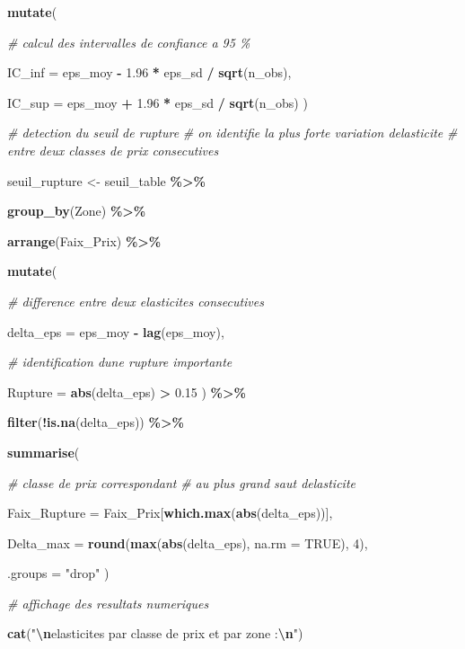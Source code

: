 \documentclass[
]{article}
\newenvironment{Shaded}{\begin{snugshade}}{\end{snugshade}}
\newcommand{\AttributeTok}[1]{\textcolor[rgb]{0.13,0.29,0.53}{#1}}
\newcommand{\CommentTok}[1]{\textcolor[rgb]{0.56,0.35,0.01}{\textit{#1}}}
\newcommand{\ConstantTok}[1]{\textcolor[rgb]{0.56,0.35,0.01}{#1}}
\newcommand{\DecValTok}[1]{\textcolor[rgb]{0.00,0.00,0.81}{#1}}
\newcommand{\FloatTok}[1]{\textcolor[rgb]{0.00,0.00,0.81}{#1}}
\newcommand{\FunctionTok}[1]{\textcolor[rgb]{0.13,0.29,0.53}{\textbf{#1}}}
\newcommand{\NormalTok}[1]{#1}
\newcommand{\OtherTok}[1]{\textcolor[rgb]{0.56,0.35,0.01}{#1}}
\newcommand{\SpecialCharTok}[1]{\textcolor[rgb]{0.81,0.36,0.00}{\textbf{#1}}}
\newcommand{\StringTok}[1]{\textcolor[rgb]{0.31,0.60,0.02}{#1}}
\begin{document}
\begin{Shaded}
\begin{Highlighting}[]
  \FunctionTok{mutate}\NormalTok{(}

    \CommentTok{\# calcul des intervalles de confiance a 95 \%}

    \AttributeTok{IC\_inf =}\NormalTok{ eps\_moy }\SpecialCharTok{{-}} \FloatTok{1.96} \SpecialCharTok{*}\NormalTok{ eps\_sd }\SpecialCharTok{/} \FunctionTok{sqrt}\NormalTok{(n\_obs),}

    \AttributeTok{IC\_sup =}\NormalTok{ eps\_moy }\SpecialCharTok{+} \FloatTok{1.96} \SpecialCharTok{*}\NormalTok{ eps\_sd }\SpecialCharTok{/} \FunctionTok{sqrt}\NormalTok{(n\_obs)}
\NormalTok{  )}


\CommentTok{\# detection du seuil de rupture}
\CommentTok{\# on identifie la plus forte variation d\textquotesingle{}elasticite}
\CommentTok{\# entre deux classes de prix consecutives}

\NormalTok{seuil\_rupture }\OtherTok{\textless{}{-}}\NormalTok{ seuil\_table }\SpecialCharTok{\%\textgreater{}\%}

  \FunctionTok{group\_by}\NormalTok{(Zone) }\SpecialCharTok{\%\textgreater{}\%}

  \FunctionTok{arrange}\NormalTok{(Faix\_Prix) }\SpecialCharTok{\%\textgreater{}\%}

  \FunctionTok{mutate}\NormalTok{(}

    \CommentTok{\# difference entre deux elasticites consecutives}

    \AttributeTok{delta\_eps =}\NormalTok{ eps\_moy }\SpecialCharTok{{-}} \FunctionTok{lag}\NormalTok{(eps\_moy),}

    \CommentTok{\# identification d\textquotesingle{}une rupture importante}

    \AttributeTok{Rupture =} \FunctionTok{abs}\NormalTok{(delta\_eps) }\SpecialCharTok{\textgreater{}} \FloatTok{0.15}
\NormalTok{  ) }\SpecialCharTok{\%\textgreater{}\%}

  \FunctionTok{filter}\NormalTok{(}\SpecialCharTok{!}\FunctionTok{is.na}\NormalTok{(delta\_eps)) }\SpecialCharTok{\%\textgreater{}\%}

  \FunctionTok{summarise}\NormalTok{(}

    \CommentTok{\# classe de prix correspondant}
    \CommentTok{\# au plus grand saut d\textquotesingle{}elasticite}

    \AttributeTok{Faix\_Rupture =}\NormalTok{ Faix\_Prix[}\FunctionTok{which.max}\NormalTok{(}\FunctionTok{abs}\NormalTok{(delta\_eps))],}

    \AttributeTok{Delta\_max =} \FunctionTok{round}\NormalTok{(}\FunctionTok{max}\NormalTok{(}\FunctionTok{abs}\NormalTok{(delta\_eps), }\AttributeTok{na.rm =} \ConstantTok{TRUE}\NormalTok{), }\DecValTok{4}\NormalTok{),}

    \AttributeTok{.groups =} \StringTok{"drop"}
\NormalTok{  )}


\CommentTok{\# affichage des resultats numeriques}

\FunctionTok{cat}\NormalTok{(}\StringTok{"}\SpecialCharTok{\textbackslash{}n}\StringTok{elasticites par classe de prix et par zone :}\SpecialCharTok{\textbackslash{}n}\StringTok{"}\NormalTok{)}
\end{Highlighting}
\end{Shaded}
\end{document}
